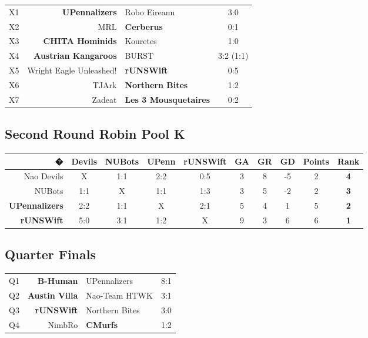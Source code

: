 \documentclass[pdftex,11pt,a4paper]{report}
\begin{document}
\begin{center}
   \begin{tabular}{crlc}
      X1 &\textbf{UPennalizers} & Robo Eireann & 3:0  \\
      X2 & MRL  &\textbf{Cerberus} & 0:1  \\
      X3 &\textbf{CHITA Hominids}  & Kouretes  & 1:0  \\
      X4 &\textbf{Austrian Kangaroos}  & BURST  & 3:2 (1:1)  \\
      X5 & Wright Eagle Unleashed!  &\textbf{rUNSWift}  & 0:5  \\
      X6 & TJArk  &\textbf{Northern Bites}  & 1:2  \\
      X7 & Zadeat  &\textbf{Les 3 Mousquetaires}  & 0:2 
   \end{tabular}
\end{center}

\subsection*{Second Round Robin Pool K}

\begin{center}
   \begin{tabular}{rccccccccc}
      � & Devils  & NUBots  & UPenn  & rUNSWift  &GA &GR &GD &Points &Rank \\
      \hline
      Nao Devils  &X &1:1 &2:2 &0:5 &3 &8 &-5 &2 &\textbf{4} \\
      NUBots  &1:1 &X &1:1 &1:3 &3 &5 &-2 &2 &\textbf{3} \\
      \textbf{UPennalizers} &2:2 &1:1 &X &2:1 &5 &4 &1 &5 &\textbf{2} \\
      \textbf{rUNSWift} &5:0 &3:1 &1:2 &X &9 &3 &6 &6 &\textbf{1}
   \end{tabular}
\end{center}

\subsection*{Quarter Finals}

\begin{center}
   \begin{tabular}{crlc}
      Q1 &\textbf{B-Human} &UPennalizers  &8:1 \\
      Q2 &\textbf{Austin Villa} & Nao-Team HTWK  &3:1 \\
      Q3 &\textbf{rUNSWift} & Northern Bites  &3:0 \\
      Q4 &NimbRo  &\textbf{CMurfs} &1:2
   \end{tabular}
\end{center}
\end{document}
